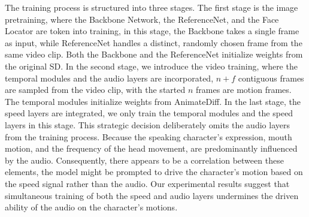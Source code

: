 The training process is structured into three stages. The first stage is the image pretraining, where the Backbone Network, the ReferenceNet, and the Face Locator are token into training, in this stage, the Backbone takes a single frame as input, while ReferenceNet handles a distinct, randomly chosen frame from the same video clip. Both the Backbone and the ReferenceNet initialize weights from the original SD. In the second stage, we introduce the video training, where the temporal modules and the audio layers are incorporated, $n + f$ contiguous frames are sampled from the video clip, with the started $n$ frames are motion frames. The temporal modules initialize weights from AnimateDiff\cite{animatediff}. In the last stage, the speed layers are integrated, we only train the temporal modules and the speed layers in this stage. This strategic decision deliberately omits the audio layers from the training process. Because the speaking character's expression, mouth motion, and the frequency of the head movement, are predominantly influenced by the audio. Consequently, there appears to be a correlation between these elements, the model might be prompted to drive the character's motion based on the speed signal rather than the audio. Our experimental results suggest that simultaneous training of both the speed and audio layers undermines the driven ability of the audio on the character's motions.